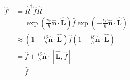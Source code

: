 \documentclass{article}
\renewcommand{\vec}[1]{\boldsymbol{\mathbf{#1}}}
\newcommand{\uvec}[1]{\hat{\vec{#1}}}
\begin{document}
\begin{align*}
  \hat{f}' & = \hat{R}^\dagger \hat{f} \hat{R}                                                                                                                   \\
           & = \exp \left( \frac{i \varphi}{\hbar} \uvec{n} \cdot \uvec{L} \right) \hat{f} \exp \left( -\frac{i \varphi}{\hbar} \uvec{n} \cdot \uvec{L} \right)  \\
           & \approx \left( 1 + \frac{i \delta}{\hbar} \uvec{n} \cdot \uvec{L} \right) \hat{f} \left( 1 - \frac{i \delta}{\hbar} \uvec{n} \cdot \uvec{L} \right) \\
           & = \hat{f} + \frac{i \delta}{\hbar} \uvec{n} \cdot [\uvec{L}, \hat{f}]                                                                               \\
           & = \hat{f}
\end{align*}

\subsection{}
\end{document}

